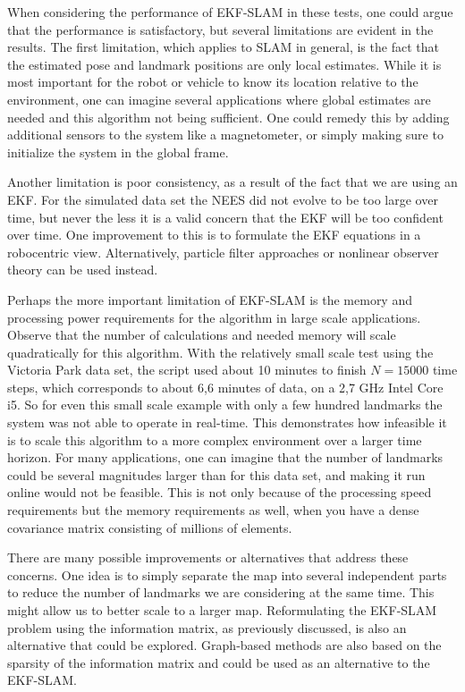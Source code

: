 
When considering the performance of EKF-SLAM in these tests, one could argue that the performance is satisfactory, but several limitations are evident in the results. The first limitation, which applies to SLAM in general, is the fact that the estimated pose and landmark positions are only local estimates. While it is most important for the robot or vehicle to know its location relative to the environment, one can imagine several applications where global estimates are needed and this algorithm not being sufficient. One could remedy this by adding additional sensors to the system like a magnetometer, or simply making sure to initialize the system in the global frame. 

Another limitation is poor consistency, as a result of the fact that we are using an EKF. For the simulated data set the NEES did not evolve to be too large over time, but never the less it is a valid concern that the EKF will be too confident over time\cite{ekfslam}. One improvement to this is to formulate the EKF equations in a robocentric view. Alternatively, particle filter approaches or nonlinear observer theory can be used instead. 

Perhaps the more important limitation of EKF-SLAM is the memory and processing power requirements for the algorithm in large scale applications. Observe that the number of calculations and needed memory will scale quadratically for this algorithm. With the relatively small scale test using the Victoria Park data set, the script used about 10 minutes to finish $N=15000$ time steps, which corresponds to about 6,6 minutes of data, on a 2,7 GHz Intel Core i5. So for even this small scale example with only a few hundred landmarks the system was not able to operate in real-time. This demonstrates how infeasible it is to scale this algorithm to a more complex environment over a larger time horizon. For many applications, one can imagine that the number of landmarks could be several magnitudes larger than for this data set, and making it run online would not be feasible. This is not only because of the processing speed requirements but the memory requirements as well, when you have a dense covariance matrix consisting of millions of elements.

There are many possible improvements or alternatives that address these concerns. One idea is to simply separate the map into several independent parts to reduce the number of landmarks we are considering at the same time. This might allow us to better scale to a larger map. Reformulating the EKF-SLAM problem using the information matrix, as previously discussed, is also an alternative that could be explored. Graph-based methods are also based on the sparsity of the information matrix and could be used as an alternative to the EKF-SLAM. 

